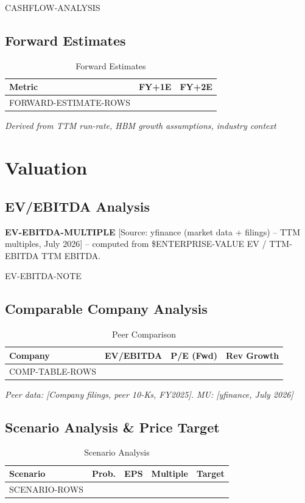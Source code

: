 \documentclass[11pt,a4paper]{report}
\newcommand{\source}[1]{\hfill\small\textit{#1}}
\begin{document}
CASHFLOW-ANALYSIS

\section{Forward Estimates}
\begin{table}[H]
\centering
\caption{Forward Estimates}
\begin{tabularx}{\textwidth}{lC{2.5cm}C{2.5cm}}
\toprule
\textbf{Metric} & \textbf{FY+1E} & \textbf{FY+2E} \\
\midrule
FORWARD-ESTIMATE-ROWS
\bottomrule
\end{tabularx}
\source{Derived from TTM run-rate, HBM growth assumptions, industry context}
\end{table}

\chapter{Valuation}

\section{EV/EBITDA Analysis}
\textbf{EV-EBITDA-MULTIPLE} [Source: yfinance (market data + filings) -- TTM multiples, July 2026] -- computed from \$ENTERPRISE-VALUE EV / TTM-EBITDA TTM EBITDA.

EV-EBITDA-NOTE

\section{Comparable Company Analysis}
\begin{table}[H]
\centering
\caption{Peer Comparison}
\begin{tabularx}{\textwidth}{lC{2cm}C{2cm}C{2.5cm}}
\toprule
\textbf{Company} & \textbf{EV/EBITDA} & \textbf{P/E (Fwd)} & \textbf{Rev Growth} \\
\midrule
COMP-TABLE-ROWS
\bottomrule
\end{tabularx}
\source{Peer data: [Company filings, peer 10-Ks, FY2025]. MU: [yfinance, July 2026]}
\end{table}

\section{Scenario Analysis \& Price Target}
\begin{table}[H]
\centering
\caption{Scenario Analysis}
\begin{tabularx}{\textwidth}{lC{2cm}C{2.5cm}C{2.5cm}C{2.5cm}}
\toprule
\textbf{Scenario} & \textbf{Prob.} & \textbf{EPS} & \textbf{Multiple} & \textbf{Target} \\
\midrule
SCENARIO-ROWS
\bottomrule
\end{tabularx}
\end{table}
\end{document}
